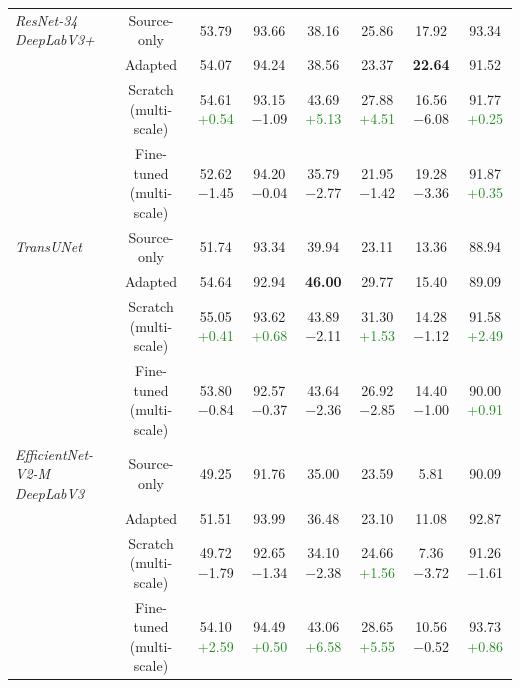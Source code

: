 \documentclass[12pt]{article}
\begin{document}
\begin{table}[htbp]
{\begin{tabular}{lccccccc}
\midrule
\textit{ResNet-34 DeepLabV3+} & Source-only & 53.79 & 93.66 & 38.16 & 25.86 & 17.92 & 93.34 \\
                              & Adapted     & 54.07 & 94.24 & 38.56 & 23.37 & \textbf{22.64} & 91.52 \\
                              & Scratch (multi-scale) & 54.61 \textcolor{ForestGreen}{+0.54} & 93.15 \textcolor{BrickRed}{−1.09} & 43.69 \textcolor{ForestGreen}{+5.13} & 27.88 \textcolor{ForestGreen}{+4.51} & 16.56 \textcolor{BrickRed}{−6.08} & 91.77 \textcolor{ForestGreen}{+0.25} \\
                              & Fine-tuned (multi-scale) & 52.62 \textcolor{BrickRed}{−1.45} & 94.20 \textcolor{BrickRed}{−0.04} & 35.79 \textcolor{BrickRed}{−2.77} & 21.95 \textcolor{BrickRed}{−1.42} & 19.28 \textcolor{BrickRed}{−3.36} & 91.87 \textcolor{ForestGreen}{+0.35} \\
\midrule
\textit{TransUNet}            & Source-only & 51.74 & 93.34 & 39.94 & 23.11 & 13.36 & 88.94 \\
                              & Adapted     & 54.64 & 92.94 & \textbf{46.00} & 29.77 & 15.40 & 89.09 \\
                              & Scratch (multi-scale) & 55.05 \textcolor{ForestGreen}{+0.41} & 93.62 \textcolor{ForestGreen}{+0.68} & 43.89 \textcolor{BrickRed}{−2.11} & 31.30 \textcolor{ForestGreen}{+1.53} & 14.28 \textcolor{BrickRed}{−1.12} & 91.58 \textcolor{ForestGreen}{+2.49} \\
                              & Fine-tuned (multi-scale) & 53.80 \textcolor{BrickRed}{−0.84} & 92.57 \textcolor{BrickRed}{−0.37} & 43.64 \textcolor{BrickRed}{−2.36} & 26.92 \textcolor{BrickRed}{−2.85} & 14.40 \textcolor{BrickRed}{−1.00} & 90.00 \textcolor{ForestGreen}{+0.91} \\
\midrule
\textit{EfficientNet-V2-M DeepLabV3} & Source-only & 49.25 & 91.76 & 35.00 & 23.59 & 5.81 & 90.09 \\
                                    & Adapted     & 51.51 & 93.99 & 36.48 & 23.10 & 11.08 & 92.87 \\
                                    & Scratch (multi-scale) & 49.72 \textcolor{BrickRed}{−1.79} & 92.65 \textcolor{BrickRed}{−1.34} & 34.10 \textcolor{BrickRed}{−2.38} & 24.66 \textcolor{ForestGreen}{+1.56} & 7.36 \textcolor{BrickRed}{−3.72} & 91.26 \textcolor{BrickRed}{−1.61} \\
                                    & Fine-tuned (multi-scale) & 54.10 \textcolor{ForestGreen}{+2.59} & 94.49 \textcolor{ForestGreen}{+0.50} & 43.06 \textcolor{ForestGreen}{+6.58} & 28.65 \textcolor{ForestGreen}{+5.55} & 10.56 \textcolor{BrickRed}{−0.52} & 93.73 \textcolor{ForestGreen}{+0.86} \\
\bottomrule
\end{tabular}
}
\end{table}



\clearpage
\printbibliography
\end{document}
